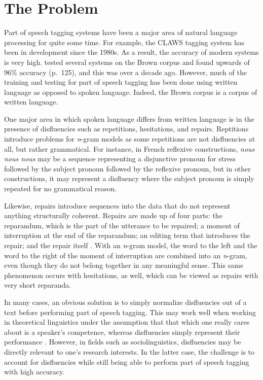\documentclass{article}
\newcommand{\lexi}[1]{\textit{#1}}
\begin{document}
  \section{The Problem}
    Part of speech tagging systems have been a major area of natural language processing for quite some time.
    For example, the CLAWS tagging system \parencite{garside_claws_1987} has been in development since the 1980s.
    As a result, the accuracy of modern systems is very high.
    \textcite{hasan_comparison_2007} tested several systems on the Brown corpus \parencite{francis_brown_1964} and found upwards of 96\% accuracy (p.~125), and this was over a decade ago.
    However, much of the training and testing for part of speech tagging has been done using written language as opposed to spoken language.
    Indeed, the Brown corpus is a corpus of written language.

    One major area in which spoken language differs from written language is in the presence of disfluencies such as repetitions, hesitations, and repairs.
    Reptitions introduce problems for \emph{n}-gram models as some repetitions are not disfluencies at all, but rather grammatical.
    For instance, in French reflexive constructions, \lexi{nous nous nous} may be a sequence representing a disjunctive pronoun for stress followed by the subject pronoun followed by the reflexive pronoun, but in other constructions, it may represent a disfluency where the subject pronoun is simply repeated for no grammatical reason.

    Likewise, repairs introduce sequences into the data that do not represent anything structurally coherent.
    Repairs are made up of four parts: the reparandum, which is the part of the utterance to be repaired; a moment of interruption at the end of the reparandum; an editing term that introduces the repair; and the repair itself \parencite{levelt_monitoring_1983}.
    With an \emph{n}-gram model, the word to the left and the word to the right of the moment of interruption are combined into an \emph{n}-gram, even though they do not belong together in any meaningful sense.
    This same phenomenon occurs with hesitations, as well, which can be viewed as repairs with very short reparanda.

    In many cases, an obvious solution is to simply normalize disfluencies out of a text before performing part of speech tagging.
    This may work well when working in theoretical linguistics under the assumption that that which one really cares about is a speaker's competence, whereas disfluencies simply represent their performance \parencite[p.~4]{chomsky_aspects_1965}.
    However, in fields such as sociolinguistics, disfluencies may be directly relevant to one's research interests.
    In the latter case, the challenge is to account for disfluencies while still being able to perform part of speech tagging with high accuracy.
\end{document}
